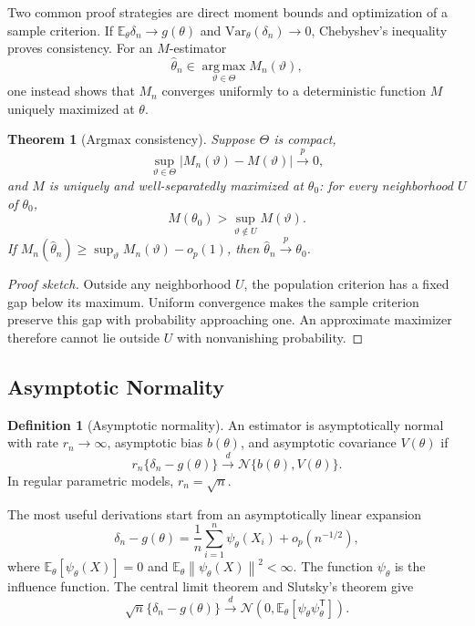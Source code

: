 \documentclass[12pt,oneside]{book}
\numberwithin{equation}{section}
\theoremstyle{definition}
\newtheorem{definition}{Definition}[section]
\theoremstyle{plain}
\newtheorem{theorem}{Theorem}[section]
\theoremstyle{remark}
\newcommand{\E}{\mathbb{E}}
\newcommand{\Var}{\mathrm{Var}}
\newcommand{\convd}{\overset{d}{\to}}
\newcommand{\convp}{\overset{p}{\to}}
\newcommand{\argmax}{\operatorname*{arg\,max}}
\newcommand{\norm}[1]{\left\lVert #1 \right\rVert}
\newcommand{\abs}[1]{\left\lvert #1 \right\rvert}
\newcommand{\Normal}{\mathcal{N}}
\begin{document}
Two common proof strategies are direct moment bounds and optimization of a
sample criterion.  If $\E_\theta\delta_n\to g(\theta)$ and
$\Var_\theta(\delta_n)\to0$, Chebyshev's inequality proves consistency.  For
an $M$-estimator
\[
    \widehat\theta_n\in\argmax_{\vartheta\in\Theta}M_n(\vartheta),
\]
one instead shows that $M_n$ converges uniformly to a deterministic function
$M$ uniquely maximized at $\theta$.

\begin{theorem}[Argmax consistency]
Suppose $\Theta$ is compact,
\[
    \sup_{\vartheta\in\Theta}
    \abs{M_n(\vartheta)-M(\vartheta)}\convp0,
\]
and $M$ is uniquely and well-separatedly maximized at $\theta_0$: for every
neighborhood $U$ of $\theta_0$,
\[
    M(\theta_0)>\sup_{\vartheta\notin U}M(\vartheta).
\]
If $M_n(\widehat\theta_n)\geq\sup_\vartheta M_n(\vartheta)-o_p(1)$, then
$\widehat\theta_n\convp\theta_0$.
\end{theorem}

\begin{proof}[Proof sketch]
Outside any neighborhood $U$, the population criterion has a fixed gap below
its maximum.  Uniform convergence makes the sample criterion preserve this
gap with probability approaching one.  An approximate maximizer therefore
cannot lie outside $U$ with nonvanishing probability.
\end{proof}

\subsection{Asymptotic Normality}

\begin{definition}[Asymptotic normality]
An estimator is asymptotically normal with rate $r_n\to\infty$, asymptotic
bias $b(\theta)$, and asymptotic covariance $V(\theta)$ if
\[
    r_n\{\delta_n-g(\theta)\}
    \convd\Normal\{b(\theta),V(\theta)\}.
\]
In regular parametric models, $r_n=\sqrt n$.
\end{definition}

The most useful derivations start from an asymptotically linear expansion
\begin{equation}
    \delta_n-g(\theta)
    =\frac1n\sum_{i=1}^n\psi_\theta(X_i)+o_p(n^{-1/2}),
    \label{eq:asymptotic-linear-estimator}
\end{equation}
where $\E_\theta[\psi_\theta(X)]=0$ and
$\E_\theta\norm{\psi_\theta(X)}^2<\infty$.  The function $\psi_\theta$ is
the influence function.  The central limit theorem and Slutsky's theorem give
\[
    \sqrt n\{\delta_n-g(\theta)\}
    \convd\Normal\left(0,
       \E_\theta[\psi_\theta\psi_\theta^\mathsf T]\right).
\]
\end{document}
